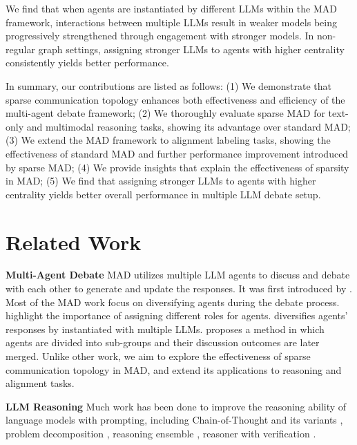 \documentclass[11pt]{article}
\begin{document}
We find that when agents are instantiated by different LLMs within the MAD framework, interactions between multiple LLMs result in weaker models being progressively strengthened through engagement with stronger models. In non-regular graph settings, assigning stronger LLMs to agents with higher centrality consistently yields better performance.

In summary, our contributions are listed as follows: (1) We demonstrate that sparse communication topology enhances both effectiveness and efficiency of the multi-agent debate framework; (2) We thoroughly evaluate sparse MAD for text-only and multimodal reasoning tasks, showing its advantage over standard MAD; (3) We extend the MAD framework to alignment labeling tasks, showing the effectiveness of standard MAD and further performance improvement introduced by sparse MAD; (4) We provide insights that explain the effectiveness of sparsity in MAD; (5) We find that assigning stronger LLMs to agents with higher centrality yields better overall performance in multiple LLM debate setup.

\section{Related Work}
\textbf{Multi-Agent Debate} MAD utilizes multiple LLM agents to discuss and debate with each other to generate and update the responses. It was first introduced by \citet{du2023improving}. Most of the MAD work focus on diversifying agents during the debate process. \citet{liang2023encouraging,park2023generative,li2023camel,chan2023chateval} highlight the importance of assigning different roles for agents. \citet{chen2023reconcile} diversifies agents' responses by instantiated with multiple LLMs. \citet{wang2024rethinking} proposes a method in which agents are divided into sub-groups and their discussion outcomes are later merged. Unlike other work, we aim to explore the effectiveness of sparse communication topology in MAD, and extend its applications to reasoning and alignment tasks.


\noindent \textbf{LLM Reasoning} Much work has been done to improve the reasoning ability of language models with prompting, including Chain-of-Thought \cite{wei2022chain} and its variants \cite{yao2024tree,besta2024graph}, problem decomposition \cite{zhou2022least}, reasoning ensemble \cite{wang2022self}, reasoner with verification \cite{cobbe2021training,wang2024multi,luo2023critique}.
\end{document}
